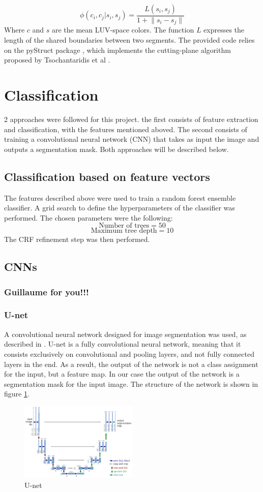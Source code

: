\documentclass[10pt,conference,compsocconf]{IEEEtran}
\begin{document}
 \begin{equation}
\phi(c_i,c_j|s_i,s_j) = \frac{L(s_i,s_j)}{1+\lVert s_i - s_j \rVert}
 \end{equation}
Where \(c\) and \(s\) are the mean LUV-space colors. The function \(L\) expresses the length of the shared boundaries between two segments.
The provided code relies on the pyStruct package \cite{muller14}, which implements the cutting-plane algorithm proposed by Tsochantaridis et al \cite{tsochantaridis05}.
	\section{Classification}
	2 approaches were followed for this project. the first consists of feature extraction and classification, with the features mentioned aboved. The second consists of training a convolutional neural network (CNN) that takes as input the image and outputs a segmentation mask. Both approaches will be described below. 	
	
	\subsection{Classification based on feature vectors}
	The features described above were used to train a random forest ensemble classifier. A grid search to define the hyperparameters of the classifier was performed. The chosen parameters were the following:
	$$\text{Number of trees} = 50$$
	$$\text{Maximum tree depth} = 10$$
	The CRF refinement step was then performed.
	\subsection{CNNs}
	\subsubsection{Guillaume for you!!!}
	\subsubsection{U-net}
	A convolutional neural network designed for image segmentation was used, as
  described in \cite{unet}. U-net is a fully convolutional neural network,
  meaning that it consists exclusively on convolutional and pooling layers, and
  not fully connected layers in the end. As a result, the output of the network
  is not a class assignment for the input, but a feature map. In our case the
  output of the network is a segmentation mask for the input image. The
  structure of the network is shown in figure \ref{fig:unet_arch}.
		\begin{figure}[h]
			\centering
			\includegraphics[width=0.5\textwidth]{pics/unet.png}
			\caption{U-net~\cite{unet}}
			\label{fig:unet_arch}
		\end{figure}
\end{document}
